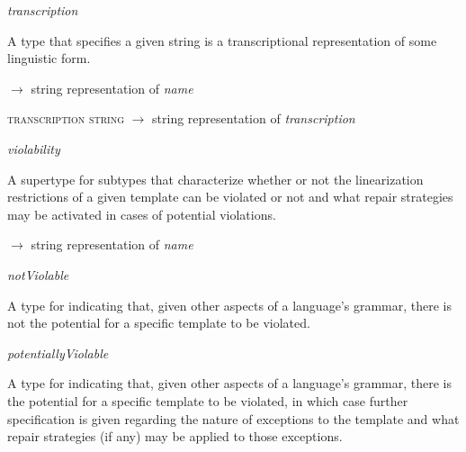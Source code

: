 \begin{ontologytop}
\begin{classlist}
\begin{proplist}
		\end{proplist}

	\end{classlist}

\item \emph{transcription}
\hspace{1em}\parbox[t]{\linegoal}{\footnotesize A type that specifies a given string is a transcriptional representation of some linguistic form.}


	\begin{proplist}

	\item \textsc{\name} $\rightarrow$ string representation of \emph{name}

	\item \textsc{transcription string} $\rightarrow$ string representation of \emph{transcription}

	\end{proplist}

\item \emph{violability}
\hspace{1em}\parbox[t]{\linegoal}{\footnotesize A supertype for subtypes that  characterize whether or not the linearization restrictions of a given template can be violated or not and what repair strategies may be activated in cases of potential violations.}


	\begin{proplist}

	\item \textsc{\name} $\rightarrow$ string representation of \emph{name}

	\end{proplist}

	\begin{classlist}

	\item \emph{notViolable}
	\hspace{1em}\parbox[t]{\linegoal}{\footnotesize A type for indicating that, given other aspects of a language's grammar, there is not the potential for a specific template to be violated.}

	\newpage
	\item \emph{potentiallyViolable}
	\hspace{1em}\parbox[t]{\linegoal}{\footnotesize A type for indicating that, given other aspects of a language's grammar, there is the potential for a specific template to be violated, in which case further specification is given regarding the nature of exceptions to the template and what repair strategies (if any) may be applied to those exceptions.}



\end{classlist}
\end{ontologytop}
